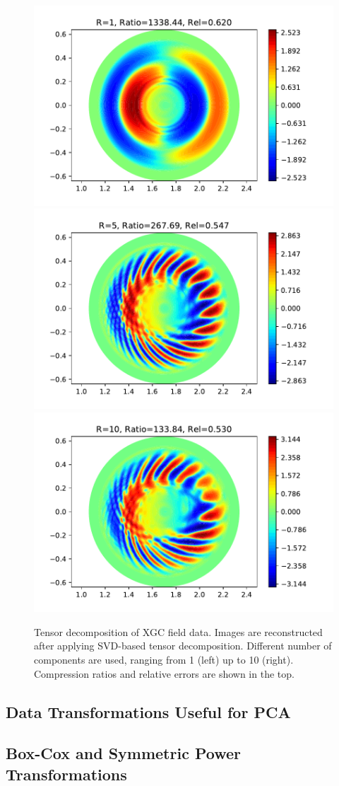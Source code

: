 \begin{figure}[!h]
  \centering
  \includegraphics[width=0.32\linewidth]{Figs/tensor-1.pdf}
  \includegraphics[width=0.32\linewidth]{Figs/tensor-5.pdf}
  \includegraphics[width=0.32\linewidth]{Figs/tensor-10.pdf}
  \caption{Tensor decomposition of XGC field data. Images are reconstructed after applying SVD-based tensor decomposition. Different number of components are used, ranging from 1 (left) up to 10 (right). Compression ratios and relative errors are shown in the top.}
  \label{fig:tensor-xgc}
\end{figure}

\newpage
\subsection{Data Transformations Useful for PCA}
\subsection{Box-Cox and Symmetric Power Transformations}

